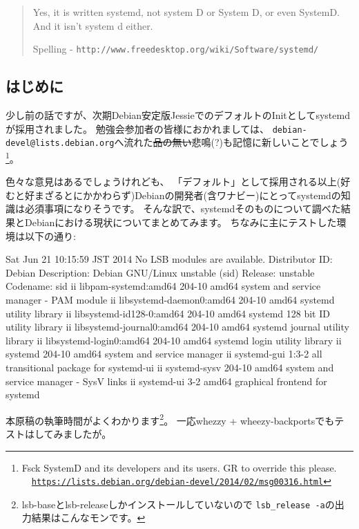 \documentclass[mingoth,a4paper]{jsarticle}
\begin{document}
\vspace{1zw}

\begin{quote}
  Yes, it is written systemd, not system D or System D, or even
  SystemD. And it isn't system d either. \\
  \begin{flushright}
    Spelling - \texttt{http://www.freedesktop.org/wiki/Software/systemd/}
  \end{flushright}
\end{quote}

\subsection{はじめに}

少し前の話ですが、次期Debian安定版JessieでのデフォルトのInitとしてsystemdが採用されました。
勉強会参加者の皆様におかれましては、%
\texttt{debian-devel@lists.debian.org}へ流れた\sout{品の無い}悲鳴(?)も記憶に新しいことでしょう
\footnote{%
Fsck SystemD and its developers and its users. GR to override this please.\\
　\href{https://lists.debian.org/debian-devel/2014/02/msg00316.html}{\texttt{https://lists.debian.org/debian-devel/2014/02/msg00316.html}}%
}。

色々な意見はあるでしょうけれども、
「デフォルト」として採用される以上(好むと好まざるとにかかわらず)Debianの開発者(含ワナビー)にとってsystemdの知識は必須事項になりそうです。
そんな訳で、systemdそのものについて調べた結果とDebianにおける現状についてまとめてみます。%
ちなみに主にテストした環境は以下の通り:
\begin{commandline}
Sat Jun 21 10:15:59 JST 2014
No LSB modules are available.
Distributor ID: Debian
Description:    Debian GNU/Linux unstable (sid)
Release:        unstable
Codename:       sid
ii  libpam-systemd:amd64        204-10   amd64   system and service manager - PAM module
ii  libsystemd-daemon0:amd64    204-10   amd64   systemd utility library
ii  libsystemd-id128-0:amd64    204-10   amd64   systemd 128 bit ID utility library
ii  libsystemd-journal0:amd64   204-10   amd64   systemd journal utility library
ii  libsystemd-login0:amd64     204-10   amd64   systemd login utility library
ii  systemd                     204-10   amd64   system and service manager
ii  systemd-gui                 1:3-2    all     transitional package for systemd-ui
ii  systemd-sysv                204-10   amd64   system and service manager - SysV links
ii  systemd-ui                  3-2      amd64   graphical frontend for systemd
\end{commandline}
\noindent
本原稿の執筆時間がよくわかります\footnote{%
  lsb-baseとlsb-releaseしかインストールしていないので%
  \texttt{lsb\_release -a}の出力結果はこんなモンです。
}。
%
一応whezzy + wheezy-backportsでもテストはしてみましたが。
\end{document}
